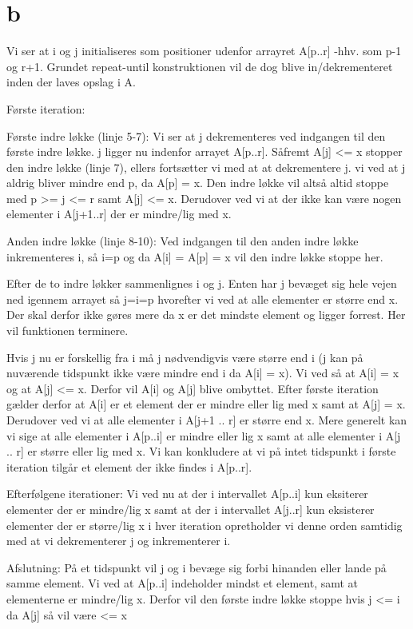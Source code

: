 \section{b}
Vi ser at i og j initialiseres som positioner udenfor arrayret A[p..r] -hhv. som p-1 og r+1.
Grundet repeat-until konstruktionen vil de dog blive in/dekrementeret inden der laves opslag i A.

Første iteration:

Første indre løkke (linje 5-7):
Vi ser at j dekrementeres ved indgangen til den første indre løkke. j ligger nu indenfor arrayet A[p..r]. 
Såfremt A[j] <= x stopper den indre løkke (linje 7), ellers fortsætter vi med at at dekrementere j.
vi ved at j aldrig bliver mindre end p, da A[p] = x. Den indre løkke vil altså altid stoppe med p >= j <= r samt A[j] <= x.
Derudover ved vi at der ikke kan være nogen elementer i A[j+1..r] der er mindre/lig med x.
 
Anden indre løkke (linje 8-10):
Ved indgangen til den anden indre løkke inkrementeres i, så i=p og da A[i] = A[p] = x vil den indre løkke stoppe her.

Efter de to indre løkker sammenlignes i og j.
Enten har j bevæget sig hele vejen ned igennem arrayet så j=i=p hvorefter vi ved at alle elementer er større end x. Der skal derfor ikke gøres mere da x er det mindste element og ligger forrest. Her vil funktionen terminere.

Hvis j nu er forskellig fra i må j nødvendigvis være større end i (j kan på nuværende tidspunkt ikke være mindre end i da A[i] = x).
Vi ved så at A[i] = x og at A[j] <= x. Derfor vil A[i] og A[j] blive ombyttet.
Efter første iteration gælder derfor at A[i] er et element der er mindre eller lig med x samt at A[j] = x. Derudover ved vi at alle elementer i A[j+1 .. r] er større end x.
Mere generelt kan vi sige at alle elementer i A[p..i] er mindre eller lig x samt at alle elementer i A[j .. r] er større eller lig med x.
Vi kan konkludere at vi på intet tidspunkt i første iteration tilgår et element der ikke findes i A[p..r].


Efterfølgene iterationer:
Vi ved nu at der i intervallet A[p..i] kun eksiterer elementer der er mindre/lig x samt at der i intervallet A[j..r] kun eksisterer elementer der er større/lig x
i hver iteration opretholder vi denne orden samtidig med at vi dekrementerer j og inkrementerer i.


Afslutning:
På et tidspunkt vil j og i bevæge sig forbi hinanden eller lande på samme element. 
Vi ved at A[p..i] indeholder mindst et element, samt at elementerne er mindre/lig x. Derfor vil den første indre løkke stoppe hvis j <= i da A[j] så vil være <= x

